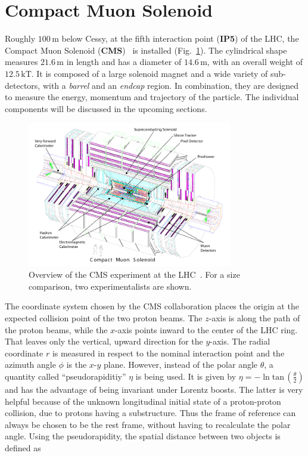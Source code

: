 \section{Compact Muon Solenoid}
\label{sec:cms}

Roughly $100\,\text{m}$ below Cessy, at the fifth interaction point (\textbf{IP5}) of the LHC, the Compact Muon Solenoid (\textbf{CMS})~\cite{cmsjinst} is installed (Fig.~\ref{fig:cms}). The cylindrical shape measures $21.6\,\text{m}$ in length and has a diameter of $14.6\,\text{m}$, with an overall weight of $12.5\,\text{kT}$. It is composed of a large solenoid magnet and a wide variety of sub-detectors, with a \textit{barrel} and an \textit{endcap} region. In combination, they are designed to measure the energy, momentum and trajectory of the particle. The individual components will be discussed in the upcoming sections.

\begin{figure}[ht!]
  \centering
  \includegraphics[width=0.8\textwidth]{plots/cms.pdf}
  \caption{Overview of the CMS experiment at the LHC~\cite{cmsjinst}. For a size comparison, two experimentalists are shown.}
  \label{fig:cms}
\end{figure}

The coordinate system chosen by the CMS collaboration places the origin at the expected collision point of the two proton beams. The $z$-axis is along the path of the proton beams, while the $x$-axis points inward to the center of the LHC ring. That leaves only the vertical, upward direction for the $y$-axis. The radial coordinate $r$ is measured in respect to the nominal interaction point and the azimuth angle $\phi$ is the $x$-$y$ plane. However, instead of the polar angle $\theta$, a quantity called ``pseudorapiditiy'' $\eta$ is being used. It is given by $\eta = - \ln{\text{tan}\,\left(\frac{\theta}{2}\right)}$ and has the advantage of being invariant under Lorentz boosts. The latter is very helpful because of the unknown longitudinal initial state of a proton-proton collision, due to protons having a substructure. Thus the frame of reference can always be chosen to be the rest frame, without having to recalculate the polar angle. Using the pseudorapidity, the spatial distance between two objects is defined as

